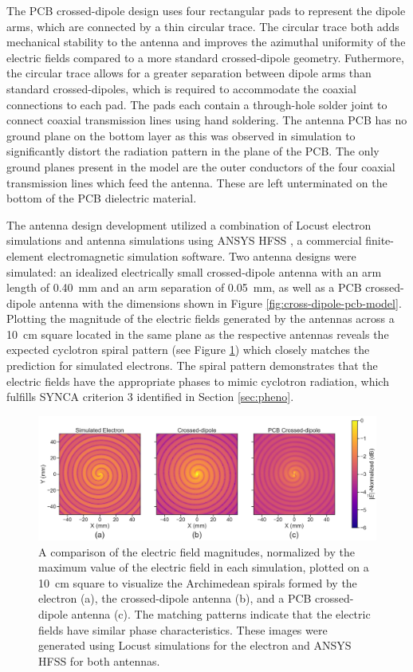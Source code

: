 The PCB crossed-dipole design uses four rectangular pads to represent the dipole arms, which are connected by a thin circular trace. The circular trace both adds mechanical stability to the antenna and improves the azimuthal uniformity of the electric fields compared to a more standard crossed-dipole geometry. Futhermore, the circular trace allows for a greater separation between dipole arms than standard crossed-dipoles, which is required to accommodate the coaxial connections to each pad. The pads each contain a through-hole solder joint to connect coaxial transmission lines using hand soldering. The antenna PCB has no ground plane on the bottom layer as this was observed in simulation to significantly distort the radiation pattern in the plane of the PCB. The only ground planes present in the model are the outer conductors of the four coaxial transmission lines which feed the antenna. These are left unterminated on the bottom of the PCB dielectric material.

The antenna design development utilized a combination of Locust electron simulations and antenna simulations using ANSYS HFSS \cite{hfss}, a commercial finite-element electromagnetic simulation software. Two antenna designs were simulated: an idealized electrically small crossed-dipole antenna with an arm length of 0.40~mm and an arm separation of 0.05~mm, as well as a PCB crossed-dipole antenna with the dimensions shown in Figure \ref{fig:cross-dipole-pcb-model}. Plotting the magnitude of the electric fields generated by the antennas across a 10~cm square located in the same plane as the respective antennas reveals the expected cyclotron spiral pattern (see Figure \ref{fig:spiral-comparison}) which closely matches the prediction for simulated electrons. The spiral pattern demonstrates that the electric fields have the appropriate phases to mimic cyclotron radiation, which fulfills SYNCA criterion 3 identified in Section \ref{sec:pheno}.
\begin{figure}[h]
    \centering
    \includegraphics[width=1.\textwidth]{figs/Chapter-5/220812_compare_spirals.png}
    \caption{A comparison of the electric field magnitudes, normalized by the maximum value of the electric field in each simulation, plotted on a 10~cm square to visualize the Archimedean spirals formed by the electron (a), the crossed-dipole antenna (b), and a PCB crossed-dipole antenna (c). The matching patterns indicate that the electric fields have similar phase characteristics. These images were generated using Locust simulations for the electron and ANSYS HFSS for both antennas.}
    \label{fig:spiral-comparison}
\end{figure}

